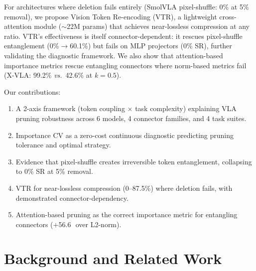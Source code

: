 \documentclass[10pt,letterpaper]{article}
\newcommand{\pp}{\,\text{pp}}
\newcommand{\vs}{\textit{vs.}}
\begin{document}
For architectures where deletion fails entirely (SmolVLA pixel-shuffle: 0\% at 5\% removal), we propose Vision Token Re-encoding (VTR), a lightweight cross-attention module ($\sim$22M params) that achieves near-lossless compression at any ratio. VTR's effectiveness is itself connector-dependent: it rescues pixel-shuffle entanglement (0\%$\to$60.1\%) but fails on MLP projectors (0\% SR), further validating the diagnostic framework. We also show that attention-based importance metrics rescue entangling connectors where norm-based metrics fail (X-VLA: 99.2\% \vs\ 42.6\% at $k\!=\!0.5$).

Our contributions:
\begin{enumerate}
\item A 2-axis framework (token coupling $\times$ task complexity) explaining VLA pruning robustness across 6 models, 4 connector families, and 4 task suites.
\item Importance CV as a zero-cost continuous diagnostic predicting pruning tolerance and optimal strategy.
\item Evidence that pixel-shuffle creates irreversible token entanglement, collapsing to 0\% SR at 5\% removal.
\item VTR for near-lossless compression (0--87.5\%) where deletion fails, with demonstrated connector-dependency.
\item Attention-based pruning as the correct importance metric for entangling connectors ($+$56.6\pp\ over L2-norm).
\end{enumerate}


\section{Background and Related Work}
\label{sec:background}
\end{document}
